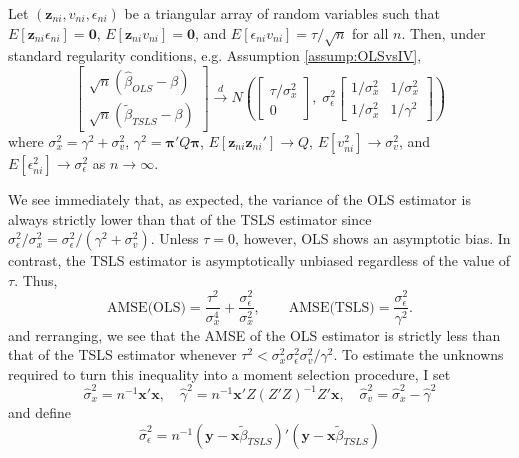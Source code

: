 \begin{thm}
	\label{thm:OLSvsIV} 
		Let $(\mathbf{z}_{ni}, v_{ni}, \epsilon_{ni})$ be a triangular array of random variables such that $E[\mathbf{z}_{ni} \epsilon_{ni}]=\mathbf{0}$, $E[\mathbf{z}_{ni} v_{ni}]=\mathbf{0}$, and $E[\epsilon_{ni}v_{ni}] = \tau/\sqrt{n}$ for all $n$. Then, under standard regularity conditions, e.g. Assumption \ref{assump:OLSvsIV}, 
	$$
\left[
\begin{array}{c}
  \sqrt{n}(\widehat{\beta}_{OLS} - \beta) \\
  \sqrt{n}(\widetilde{\beta}_{TSLS} - \beta)
\end{array}
\right] \overset{d}{\rightarrow}
N\left(
\left[
\begin{array}{c}
\tau/\sigma_x^2 \\ 
0
\end{array}
\right],\;
\sigma_\epsilon^2 \left[ \begin{array}{cc}
  1/\sigma_x^2 & 1/\sigma_x^2\\
  1/\sigma_x^2 & 1/\gamma^2 
  \end{array}\right]
  \right)
$$
where $\sigma_x^2 = \gamma^2 + \sigma_v^2$, $\gamma^2 = \boldsymbol{\pi}'Q \boldsymbol{\pi}$, $E[\mathbf{z}_{ni} \mathbf{z}_{ni}'] \rightarrow Q$, $E[v_{ni}^2]\rightarrow \sigma_v^2$, and $E[\epsilon_{ni}^2] \rightarrow \sigma_\epsilon^2$ as $n\rightarrow \infty$.
\end{thm}
We see immediately that, as expected, the variance of the OLS estimator is always strictly lower than that of the TSLS estimator since $\sigma^2_\epsilon/\sigma_x^2 = \sigma^2_\epsilon/(\gamma^2 + \sigma_v^2)$. 
Unless $\tau = 0$, however, OLS shows an asymptotic bias. 
In contrast, the TSLS estimator is asymptotically unbiased regardless of the value of $\tau$.  
Thus,
$$\mbox{AMSE(OLS)} = \frac{\tau^2}{\sigma_x^4} + \frac{\sigma_\epsilon^2}{\sigma_x^2},\quad \quad
  \mbox{AMSE(TSLS)} = \frac{\sigma_\epsilon^2}{\gamma^2}.$$
 and rerranging, we see that the AMSE of the OLS estimator is strictly less than that of the TSLS estimator whenever $\tau^2  < \sigma_x^2 \sigma_\epsilon^2\sigma_v^2/\gamma^2$. 
To estimate the unknowns required to turn this inequality into a moment selection procedure, I set 
  $$\widehat{\sigma}_x^2 = n^{-1}\mathbf{x}'\mathbf{x}, \quad \widehat{\gamma}^2 = n^{-1}\mathbf{x}'Z(Z'Z)^{-1}Z'\mathbf{x}, \quad \widehat{\sigma}_v^2 =  \widehat{\sigma}_x^2 - \widehat{\gamma}^2$$
and define
$$\widehat{\sigma}_\epsilon^2 = n^{-1}\left(\textbf{y} - \textbf{x}\widetilde{\beta}_{TSLS} \right)'\left(\textbf{y} - \textbf{x}\widetilde{\beta}_{TSLS} \right)$$
